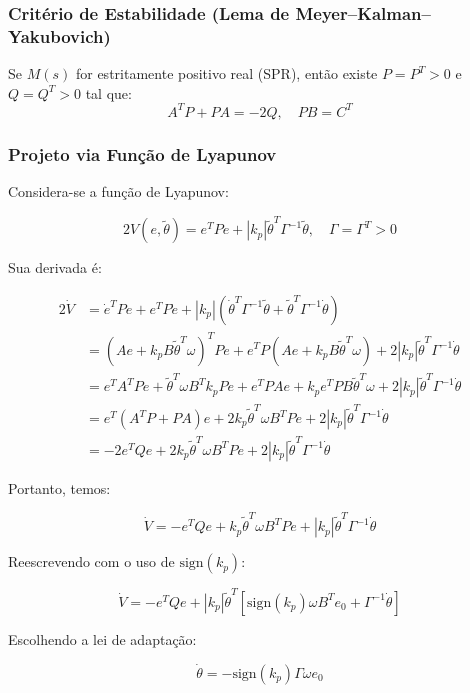 \documentclass[10pt]{article}
\begin{document}
\subsubsection{Critério de Estabilidade (Lema de Meyer–Kalman–Yakubovich)}

Se \( M(s) \) for estritamente positivo real (SPR), então existe \( P = P^T > 0 \) e \( Q = Q^T > 0 \) tal que:
\[
A^T P + P A = -2Q, \quad P B = C^T
\]

\subsubsection{Projeto via Função de Lyapunov}

Considera-se a função de Lyapunov:

\[
2V(e, \tilde{\theta}) = e^T P e + |k_p| \tilde{\theta}^T \Gamma^{-1} \tilde{\theta}, \quad \Gamma = \Gamma^T > 0
\]

Sua derivada é:

\begin{align*}
2\dot{V} &= \dot{e}^T P e + e^T P \dot{e} + |k_p| \left( \dot{\theta}^T \Gamma^{-1} \tilde{\theta} + \tilde{\theta}^T \Gamma^{-1} \dot{\theta} \right) \\
&= \left(A e + k_p B \tilde{\theta}^T \omega \right)^T P e + e^T P \left(A e + k_p B \tilde{\theta}^T \omega \right) + 2|k_p| \tilde{\theta}^T \Gamma^{-1} \dot{\theta} \\
&= e^T A^T P e + \tilde{\theta}^T \omega B^T k_p P e + e^T P A e + k_p e^T P B \tilde{\theta}^T \omega + 2|k_p| \tilde{\theta}^T \Gamma^{-1} \dot{\theta} \\
&= e^T (A^T P + P A) e + 2 k_p \tilde{\theta}^T \omega B^T P e + 2|k_p| \tilde{\theta}^T \Gamma^{-1} \dot{\theta} \\
&= -2 e^T Q e + 2 k_p \tilde{\theta}^T \omega B^T P e + 2|k_p| \tilde{\theta}^T \Gamma^{-1} \dot{\theta}
\end{align*}

Portanto, temos:

\[
\dot{V} = -e^T Q e + k_p \tilde{\theta}^T \omega B^T P e + |k_p| \tilde{\theta}^T \Gamma^{-1} \dot{\theta}
\]

Reescrevendo com o uso de \( \text{sign}(k_p) \):

\[
\dot{V} = -e^T Q e + |k_p| \tilde{\theta}^T \left[ \text{sign}(k_p) \omega B^T e_0 + \Gamma^{-1} \dot{\theta} \right]
\]

Escolhendo a lei de adaptação:

\[
\dot{\theta} = -\text{sign}(k_p) \Gamma \omega e_0
\]
\end{document}
